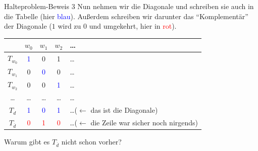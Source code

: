 \begin{frame}{Halteproblem-Beweis 3}
    Nun nehmen wir die Diagonale und schreiben sie auch in die Tabelle (hier \textcolor{blue}{blau}). Außerdem schreiben wir darunter das ``Komplementär'' der Diagonale ($1$ wird zu $0$ und umgekehrt, hier in \textcolor{red}{rot}).
    \begin{table}
        \centering
        \begin{tabular}{ccccl}
            \toprule
                     & $w_0$ & $w_1$ & $w_2$ & \dots\\
             \midrule
             $T_{w_0}$ & \textcolor{blue}{1} & 0 & 1 & \dots\\
             $T_{w_1}$ & 0 & \textcolor{blue}{0} & 0 & \dots\\
             $T_{w_2}$ & 0 & 0 & \textcolor{blue}{1} & \dots\\
             \dots   &  \dots & \dots  & \dots  & \dots \\
             $T_d$ & \textcolor{blue}{1} & \textcolor{blue}{0} & \textcolor{blue}{1} &\dots ($\leftarrow$ das ist die Diagonale) \\
             $T_{\overline{d}}$ & \textcolor{red}{0} & \textcolor{red}{1} & \textcolor{red}{0} & \dots($\leftarrow$ die Zeile war sicher noch nirgends) \\
             \bottomrule
        \end{tabular}
    \end{table}
    Warum gibt es $T_{\overline{d}}$ nicht schon vorher?\\
\end{frame}
